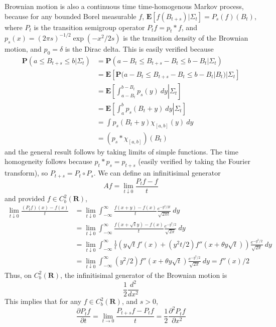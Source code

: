 Brownian motion is also a continuous time time-homogenous Markov process, because for any bounded Borel measurable $f$, $\mathbf{E}[f(B_{t+s}) | \Sigma_t] = P_s(f)(B_t)$, where $P_t$ is the transition semigroup operator $P_t f = p_t * f$, and $p_s(x) = (2 \pi s)^{-1/2} \exp(-x^2/2s)$ is the transition density of the Brownian motion, and $p_0 = \delta$ is the Dirac delta. This is easily verified because
%
\begin{align*}
    \mathbf{P}(a \leq B_{t+s} \leq b | \Sigma_t) &= \mathbf{P}(a - B_t \leq B_{t+s} - B_t \leq b - B_t | \Sigma_t)\\
    &= \mathbf{E}[\mathbf{P}(a - B_t \leq B_{t+s} - B_t \leq b - B_t | B_t) | \Sigma_t]\\
    &= \mathbf{E} \left. \left[ \int_{a - B_t}^{b - B_t} p_s(y)\ dy \right| \Sigma_t \right]\\
    &= \mathbf{E} \left. \left[ \int_a^b p_s(B_t + y)\ dy \right| \Sigma_t \right]\\
    &= \int p_s(B_t + y) \chi_{[a,b]}(y)\ dy\\
    &= (p_s * \chi_{[a,b]})(B_t)
\end{align*}
%
and the general result follows by taking limits of simple functions. The time homogeneity follows because $p_t * p_s = p_{t+s}$ (easily verified by taking the Fourier transform), so $P_{t+s} = P_t \circ P_s$. We can define an infinitisimal generator
%
\[ Af = \lim_{t \downarrow 0} \frac{P_tf - f}{t} \]
%
and provided $f \in C_b^2(\mathbf{R})$,
%
\begin{align*}
    \lim_{t \downarrow 0} \frac{(P_tf)(x) - f(x)}{t} &= \lim_{t \downarrow 0} \int_{-\infty}^\infty \frac{f(x + y) - f(x)}{t} \frac{e^{-y^2/2t}}{\sqrt{2\pi t}}\ dy\\
    &= \lim_{t \downarrow 0} \int_{-\infty}^\infty \frac{f(x + \sqrt{t}y) - f(x)}{t} \frac{e^{-y^2/2}}{\sqrt{2\pi}}\ dy\\
    &= \lim_{t \downarrow 0} \int_{-\infty}^\infty \frac{1}{t} \left( y \sqrt{t} f'(x) + (y^2t/2) f''(x + \theta y \sqrt{t}) \right) \frac{e^{-y^2/2}}{\sqrt{2\pi}}\ dy\\
    &= \lim_{t \downarrow 0} \int_{-\infty}^\infty (y^2/2) f''(x + \theta y \sqrt{t}) \frac{e^{-y^2/2}}{\sqrt{2\pi}}\ dy = f''(x)/2
\end{align*}
%
Thus, on $C_b^2(\mathbf{R})$, the infinitisimal generator of the Brownian motion is
%
\[ \frac{1}{2} \frac{d^2}{dx^2} \]
%
This implies that for any $f \in C_b^2(\mathbf{R})$, and $s > 0$,
%
\[ \frac{ \partial P_tf}{\partial t} = \lim_{t \to 0} \frac{P_{t+s}f - P_tf}{t} = \frac{1}{2} \frac{\partial^2 P_t f}{\partial x^2} \]

